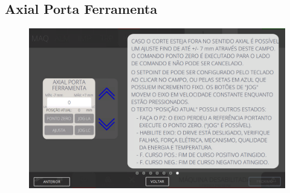 \newpage
\thispagestyle{fancy}
\vspace*{40 pt}
\subsection{Axial Porta Ferramenta}
\vspace*{\fill}
\begin{figure}[h]
    \centering
    \includegraphics[width=480 px,height=300 px]{src/imagesICV/06-dryCutter/settings/e-7.png}
\end{figure}
\vspace*{\fill}
